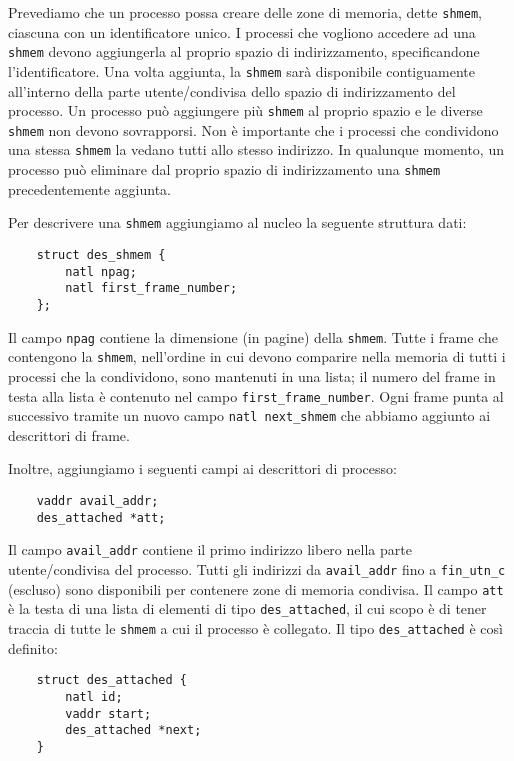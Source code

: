 Prevediamo che un processo possa creare delle zone di memoria, dette 
\verb|shmem|, ciascuna con
un identificatore unico. I processi che vogliono accedere ad una \verb|shmem|
devono aggiungerla al proprio spazio di indirizzamento, specificandone l'identificatore.
Una volta aggiunta, la \verb|shmem| sar\`a disponibile contiguamente all'interno della parte
utente/condivisa dello spazio di indirizzamento del processo. Un processo pu\`o aggiungere
pi\`u \verb|shmem| al proprio spazio e le diverse \verb|shmem| non devono sovrapporsi.
Non \`e importante che i processi che condividono una stessa \verb|shmem| la vedano tutti
allo stesso indirizzo.
In qualunque momento, un processo pu\`o eliminare dal proprio spazio di indirizzamento 
una \verb|shmem| precedentemente aggiunta.

Per descrivere una \verb|shmem| aggiungiamo al nucleo la seguente struttura dati:

\begin{verbatim}
    struct des_shmem {
        natl npag;
        natl first_frame_number;
    };
\end{verbatim}

Il campo \verb|npag| contiene la dimensione (in pagine) della \verb|shmem|.
Tutte i frame che contengono la \verb|shmem|, nell'ordine in cui
devono comparire nella memoria di tutti i processi che la condividono,
sono mantenuti in una lista; il numero del frame in testa alla lista \`e contenuto nel campo
\verb|first_frame_number|. Ogni frame
punta al successivo tramite un nuovo campo \verb|natl next_shmem| che abbiamo
aggiunto ai descrittori di frame.

Inoltre, aggiungiamo i seguenti campi ai descrittori di processo:

\begin{verbatim}
    vaddr avail_addr;
    des_attached *att;
\end{verbatim}

Il campo \verb|avail_addr| contiene il primo indirizzo libero nella parte utente/condivisa del processo.
Tutti gli indirizzi da \verb|avail_addr| fino a \verb|fin_utn_c| (escluso) sono disponibili
per contenere zone di memoria condivisa.
Il campo \verb|att| \`e la testa di una lista di elementi di tipo \verb|des_attached|,
il cui scopo \`e di tener traccia di tutte le \verb|shmem| a cui il processo \`e
collegato. Il tipo \verb|des_attached| \`e cos\`i definito:

\begin{verbatim}
    struct des_attached {
        natl id;
        vaddr start;
        des_attached *next;
    }
\end{verbatim}

